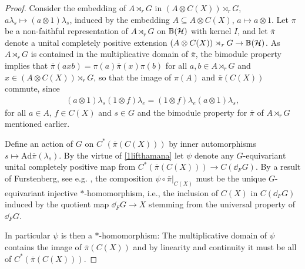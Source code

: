 \begin{proof}
	Consider the embedding of $A \rtimes_r G$ in $(A \otimes C(X)) \rtimes_r G$,  $a \lambda_s \mapsto (a \otimes 1) \lambda_s$, induced by the embedding $A \subseteq A \otimes C(X)$, $a \mapsto a \otimes 1$. Let $\pi$ be a non-faithful representation of $A \rtimes_r G$ on $\mathbb{B}(\mathcal{H})$ with kernel $I$, and let $\overline \pi$ denote a unital completely positive extension $(A \otimes C(X)) \rtimes_r G \to \mathbb{B}(\mathcal{H})$. As $A \rtimes_r G$ is contained in the multiplicative domain of $\overline \pi$, the bimodule property implies that $\overline \pi(axb) = \pi(a) \overline \pi(x) \pi(b)$ for all $a,b \in A \rtimes_r G$ and $x \in (A \otimes C(X)) \rtimes_r G$, so that the image of $\pi(A)$ and $\overline \pi(C(X))$ commute, since
	\begin{align*}
		(a \otimes 1 )\lambda_s (1 \otimes f ) \lambda_e = (1 \otimes f) \lambda_e (a \otimes 1) \lambda_s,
	\end{align*}
	for all $ a \in A$, $f \in C(X)$ and $s \in G$ and the bimodule property for $\overline \pi$ of $A \rtimes_r G$ mentioned earlier. 

	Define an action of $G$ on $C^*(\overline \pi(C(X)))$ by inner automorphisms $s \mapsto \mathrm{Ad} \overline \pi(\lambda_s)$. By the virtue of \cref{1lifthamana} let $\psi$ denote any $G$-equivariant unital completely positive map from $C^*(\overline \pi (C(X))) \to C(\dd_F G)$. By a result of Furstenberg, see e.g. \cite[lemma 4.16]{bscp}, the composition $\psi \circ \overline \pi|_{C(X)}$ must be the unique $G$-equivariant injective $*$-homomorphism, i.e., the inclusion of $C(X)$ in $C(\dd_F G)$ induced by the quotient map $\dd_F G \to X$ stemming from the universal property of $\dd_F G$.

	In particular $\psi$ is then a $*$-homomorphism: The multiplicative domain of $\psi$ contains the image of $\overline \pi(C(X))$ and by linearity and continuity it must be all of $C^*(\overline \pi (C(X)))$. 


\end{proof}
